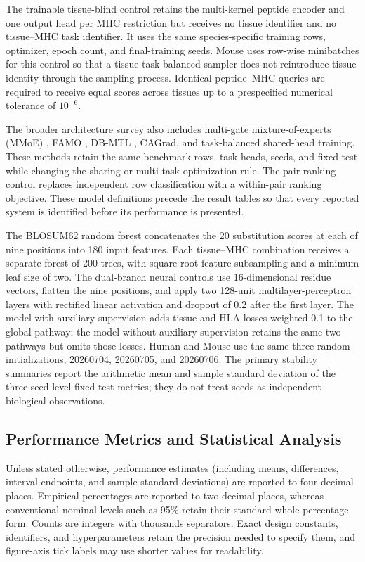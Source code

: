 The trainable tissue-blind control retains the multi-kernel peptide encoder and one output head per MHC restriction but receives no tissue identifier and no tissue--MHC task identifier. It uses the same species-specific training rows, optimizer, epoch count, and final-training seeds. Mouse uses row-wise minibatches for this control so that a tissue-task-balanced sampler does not reintroduce tissue identity through the sampling process. Identical peptide--MHC queries are required to receive equal scores across tissues up to a prespecified numerical tolerance of $10^{-6}$.

The broader architecture survey also includes multi-gate mixture-of-experts (MMoE) \cite{ma2018mmoe}, FAMO \cite{liu2023famo}, DB-MTL \cite{lin2023dbmtl}, CAGrad, and task-balanced shared-head training. These methods retain the same benchmark rows, task heads, seeds, and fixed test while changing the sharing or multi-task optimization rule. The pair-ranking control replaces independent row classification with a within-pair ranking objective. These model definitions precede the result tables so that every reported system is identified before its performance is presented.

The BLOSUM62 random forest \cite{henikoff1992blosum} concatenates the 20 substitution scores at each of nine positions into 180 input features. Each tissue--MHC combination receives a separate forest of 200 trees, with square-root feature subsampling and a minimum leaf size of two. The dual-branch neural controls use 16-dimensional residue vectors, flatten the nine positions, and apply two 128-unit multilayer-perceptron layers with rectified linear activation and dropout of 0.2 after the first layer. The model with auxiliary supervision adds tissue and HLA losses weighted 0.1 to the global pathway; the model without auxiliary supervision retains the same two pathways but omits those losses. Human and Mouse use the same three random initializations, 20260704, 20260705, and 20260706. The primary stability summaries report the arithmetic mean and sample standard deviation of the three seed-level fixed-test metrics; they do not treat seeds as independent biological observations.

\subsection{Performance Metrics and Statistical Analysis}

Unless stated otherwise, performance estimates (including means, differences, interval endpoints, and sample standard deviations) are reported to four decimal places. Empirical percentages are reported to two decimal places, whereas conventional nominal levels such as 95\% retain their standard whole-percentage form. Counts are integers with thousands separators. Exact design constants, identifiers, and hyperparameters retain the precision needed to specify them, and figure-axis tick labels may use shorter values for readability.

